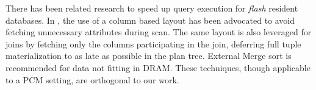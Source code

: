 \begin{comment}
Table \ref{tab:prev_work} summarises the previous work on PCM-conscious database operators algorithms.
\end{comment}
There has been related research to speed up query execution for \textit{flash} resident databases. In \cite{graefe}, the use of a column based layout has been advocated to avoid fetching unnecessary attributes during scan. The same layout is also leveraged for joins by fetching only the columns participating in the join, deferring full tuple materialization to as late as possible in the plan tree. External Merge sort is recommended for data not fitting in DRAM. These techniques, though applicable to a PCM setting, are orthogonal to our work.
